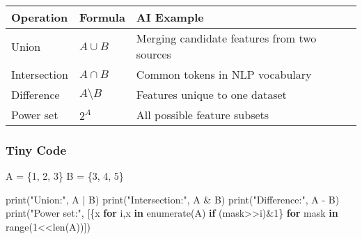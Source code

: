 \documentclass[
  letterpaper,
  DIV=11,
  numbers=noendperiod]{scrreprt}
\newenvironment{Shaded}{\begin{snugshade}}{\end{snugshade}}
\newcommand{\BuiltInTok}[1]{\textcolor[rgb]{0.00,0.23,0.31}{#1}}
\newcommand{\ControlFlowTok}[1]{\textcolor[rgb]{0.00,0.23,0.31}{\textbf{#1}}}
\newcommand{\DecValTok}[1]{\textcolor[rgb]{0.68,0.00,0.00}{#1}}
\newcommand{\KeywordTok}[1]{\textcolor[rgb]{0.00,0.23,0.31}{\textbf{#1}}}
\newcommand{\NormalTok}[1]{\textcolor[rgb]{0.00,0.23,0.31}{#1}}
\newcommand{\OperatorTok}[1]{\textcolor[rgb]{0.37,0.37,0.37}{#1}}
\newcommand{\StringTok}[1]{\textcolor[rgb]{0.13,0.47,0.30}{#1}}
\begin{document}
\begin{longtable}[]{@{}
  >{\raggedright\arraybackslash}p{}
  >{\raggedright\arraybackslash}p{}
  >{\raggedright\arraybackslash}p{}@{}}
\toprule\noalign{}
\begin{minipage}[b]{\linewidth}\raggedright
Operation
\end{minipage} & \begin{minipage}[b]{\linewidth}\raggedright
Formula
\end{minipage} & \begin{minipage}[b]{\linewidth}\raggedright
AI Example
\end{minipage} \\
\midrule\noalign{}
\endhead
\bottomrule\noalign{}
\endlastfoot
Union & \(A \cup B\) & Merging candidate features from two sources \\
Intersection & \(A \cap B\) & Common tokens in NLP vocabulary \\
Difference & \(A \setminus B\) & Features unique to one dataset \\
Power set & \(2^A\) & All possible feature subsets \\
\end{longtable}

\subsubsection{Tiny Code}\label{tiny-code-169}

\begin{Shaded}
\begin{Highlighting}[]
\NormalTok{A }\OperatorTok{=}\NormalTok{ \{}\DecValTok{1}\NormalTok{, }\DecValTok{2}\NormalTok{, }\DecValTok{3}\NormalTok{\}}
\NormalTok{B }\OperatorTok{=}\NormalTok{ \{}\DecValTok{3}\NormalTok{, }\DecValTok{4}\NormalTok{, }\DecValTok{5}\NormalTok{\}}

\BuiltInTok{print}\NormalTok{(}\StringTok{"Union:"}\NormalTok{, A }\OperatorTok{|}\NormalTok{ B)}
\BuiltInTok{print}\NormalTok{(}\StringTok{"Intersection:"}\NormalTok{, A }\OperatorTok{\&}\NormalTok{ B)}
\BuiltInTok{print}\NormalTok{(}\StringTok{"Difference:"}\NormalTok{, A }\OperatorTok{{-}}\NormalTok{ B)}
\BuiltInTok{print}\NormalTok{(}\StringTok{"Power set:"}\NormalTok{, [\{x }\ControlFlowTok{for}\NormalTok{ i,x }\KeywordTok{in} \BuiltInTok{enumerate}\NormalTok{(A) }\ControlFlowTok{if}\NormalTok{ (mask}\OperatorTok{\textgreater{}\textgreater{}}\NormalTok{i)}\OperatorTok{\&}\DecValTok{1}\NormalTok{\} }
                     \ControlFlowTok{for}\NormalTok{ mask }\KeywordTok{in} \BuiltInTok{range}\NormalTok{(}\DecValTok{1}\OperatorTok{\textless{}\textless{}}\BuiltInTok{len}\NormalTok{(A))])}
\end{Highlighting}
\end{Shaded}
\end{document}
